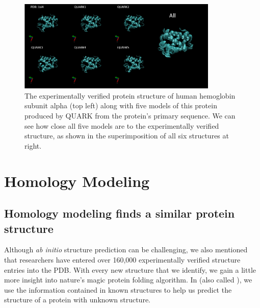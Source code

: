 \begin{figure}[h]
	\centering
	\mySfFamily
	\includegraphics[width = 0.85\textwidth]{../images/ab_initio_results.png}
	\caption{The experimentally verified protein structure of human hemoglobin subunit alpha (top left) along with five models of this protein produced by QUARK from the protein's primary sequence. We can see how close all five models are to the experimentally verified structure, as shown in the superimposition of all six structures at right.}
	\label{fig:ab_initio_results}
\end{figure}

\begin{qbox}\end{qbox}

\FloatBarrier
{}

\section{Homology Modeling}
\label{sec:homology}
\subsection{Homology modeling finds a similar protein structure}

Although \textit{ab initio} structure prediction can be challenging, we also mentioned that researchers have entered over 160,000 experimentally verified structure entries into the PDB. With every new structure that we identify, we gain a little more insight into nature's magic protein folding algorithm. In  (also called ), we use the information contained in known structures to help us predict the structure of a protein with unknown structure.

